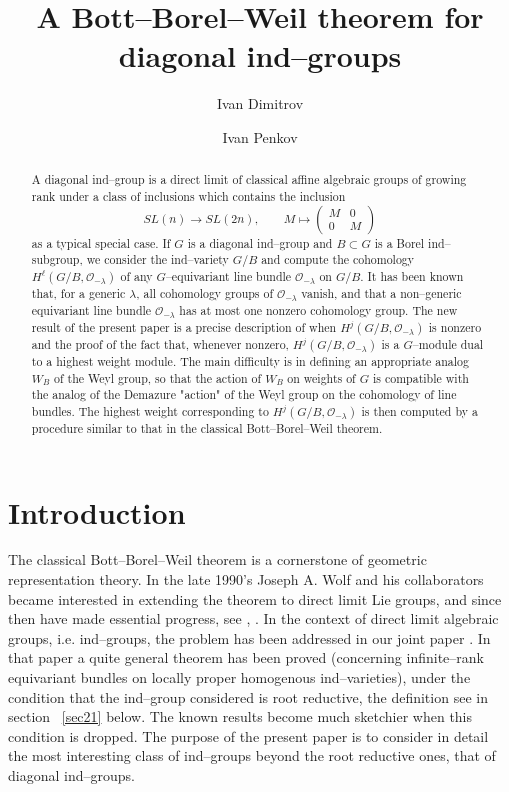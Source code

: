 \documentclass[12pt]{amsart}
\title {A Bott--Borel--Weil theorem for diagonal ind--groups}
\author{Ivan Dimitrov}
\author{Ivan Penkov}
\newcommand{\refsec}[1]{section~ \ref{#1}}
\def\cO{\mathcal{O}}
\theoremstyle{remark}
\begin{document}
\maketitle
\begin{abstract}
A diagonal ind--group is a direct limit of classical affine algebraic groups of growing rank under a class of
inclusions which contains the inclusion
$$
SL(n)\to SL(2n), \quad \quad
M\mapsto \left(\begin{array}{cc}M & 0\\ 0 & M \end{array}\right)
$$
as a typical special case. If $G$ is a diagonal ind--group and $B\subset G$ is a Borel ind--subgroup, 
we consider the ind--variety $G/B$ and compute the cohomology $H^\ell(G/B,\mathcal{O}_{-\lambda})$ 
of any $G$--equivariant line bundle $\mathcal{O}_{-\lambda}$ on $G/B$. It has been known that, for a generic $\lambda$, 
all cohomology groups of $\cO_{-\lambda}$ vanish, and that a non--generic equivariant 
line bundle $\cO_{-\lambda}$ has at most one 
nonzero cohomology group. The new result of the present paper is a precise description of when 
$H^j(G/B,\mathcal{O}_{-\lambda})$ is nonzero and the proof of the fact that, whenever nonzero, 
$H^j(G/B, \mathcal{O}_{-\lambda})$ is a $G$--module dual to a highest weight module. 
The main difficulty is in defining an appropriate analog $W_B$ of the Weyl group, so that the action of $W_B$
on weights of $G$ is compatible with the analog of the Demazure "action" of the Weyl group on the cohomology 
of line bundles. The highest weight corresponding to $H^j(G/B, \cO_{-\lambda})$ is then computed
by a procedure similar to that in the classical Bott--Borel--Weil theorem.
\end{abstract}


\section*{Introduction}
The classical Bott--Borel--Weil theorem is a cornerstone of geometric representation theory. 
In the late 1990's Joseph A. Wolf and his collaborators became interested in extending the theorem 
to direct limit Lie groups, and since then have made essential progress, see \cite{NRW}, \cite{W}. 
In the context of direct limit algebraic groups, i.e. ind--groups, the problem has been addressed in 
our joint paper \cite{DPW}. In that paper a quite general theorem has been proved (concerning 
infinite--rank equivariant bundles on locally proper homogenous ind--varieties), under the condition 
that the ind--group considered is root reductive, the definition see in \refsec{sec21} below. The known results become much 
sketchier  when this condition is dropped. The purpose of the present paper is to consider in detail 
the most interesting class of ind--groups beyond the root reductive ones, that of diagonal ind--groups.
\end{document}
